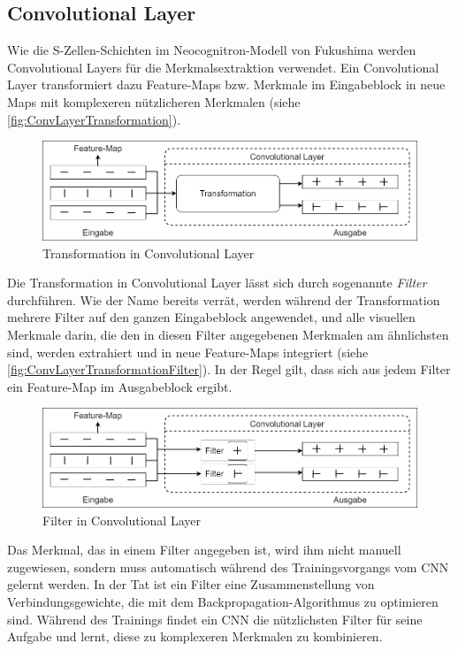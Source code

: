 \subsection{Convolutional Layer}

Wie die S-Zellen-Schichten im Neocognitron-Modell von Fukushima werden Convolutional Layers für die Merkmalsextraktion verwendet. Ein Convolutional Layer transformiert dazu Feature-Maps bzw. Merkmale im Eingabeblock in neue Maps mit komplexeren nützlicheren Merkmalen (siehe \autoref{fig:ConvLayerTransformation}).
	
\begin{figure}[!hb]
	\centering
	\includegraphics[width=\linewidth]{images/ConvLayerTransformation}
	\caption{Transformation in Convolutional Layer}
	\label{fig:ConvLayerTransformation}
\end{figure}
	
Die Transformation in Convolutional Layer lässt sich durch sogenannte \emph{Filter} durchführen. Wie der Name bereits verrät, werden während der Transformation mehrere Filter auf den ganzen Eingabeblock angewendet, und alle visuellen Merkmale darin, die den in diesen Filter angegebenen Merkmalen am ähnlichsten sind, werden extrahiert und in neue Feature-Maps integriert (siehe \autoref{fig:ConvLayerTransformationFilter}). In der Regel gilt, dass sich aus jedem Filter ein Feature-Map im Ausgabeblock ergibt.
	
\begin{figure}[h]
	\centering
	\includegraphics[width=\linewidth]{images/ConvLayerTransformationFilter}
	\caption{Filter in Convolutional Layer}
	\label{fig:ConvLayerTransformationFilter}
\end{figure}

Das Merkmal, das in einem Filter angegeben ist, wird ihm nicht manuell zugewiesen, sondern muss automatisch während des Trainingsvorgangs vom CNN gelernt werden. In der Tat ist ein Filter eine Zusammenstellung von Verbindungsgewichte, die mit dem Backpropagation-Algorithmus zu optimieren sind. Während des Trainings findet ein CNN die nützlichsten Filter für seine Aufgabe und lernt, diese zu komplexeren Merkmalen zu kombinieren.

